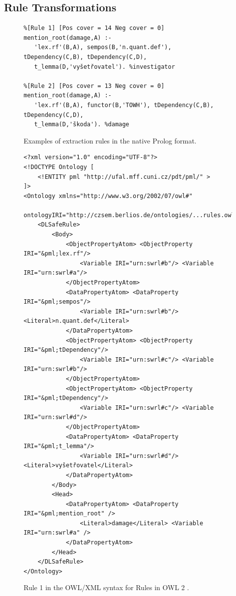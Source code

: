 \clearpage

\subsection{Rule Transformations}



\begin{figure}[h!]
\begin{verbatim}
%[Rule 1] [Pos cover = 14 Neg cover = 0]
mention_root(damage,A) :-
   'lex.rf'(B,A), sempos(B,'n.quant.def'), tDependency(C,B), tDependency(C,D), 
   t_lemma(D,'vyšetřovatel'). %investigator

%[Rule 2] [Pos cover = 13 Neg cover = 0]
mention_root(damage,A) :-
   'lex.rf'(B,A), functor(B,'TOWH'), tDependency(C,B), tDependency(C,D), 
   t_lemma(D,'škoda'). %damage
\end{verbatim}
	\caption{Examples of extraction rules in the native Prolog format.}
	\label{fig:rules_prolog}
\end{figure}



\begin{figure}[h!]
\begin{verbatim}
<?xml version="1.0" encoding="UTF-8"?>
<!DOCTYPE Ontology [
	<!ENTITY pml "http://ufal.mff.cuni.cz/pdt/pml/" >
]>
<Ontology xmlns="http://www.w3.org/2002/07/owl#"
	ontologyIRI="http://czsem.berlios.de/ontologies/...rules.owl">
	<DLSafeRule>
		<Body>
			<ObjectPropertyAtom> <ObjectProperty IRI="&pml;lex.rf"/>
				<Variable IRI="urn:swrl#b"/> <Variable IRI="urn:swrl#a"/>
			</ObjectPropertyAtom>
			<DataPropertyAtom> <DataProperty IRI="&pml;sempos"/>
				<Variable IRI="urn:swrl#b"/> <Literal>n.quant.def</Literal>
			</DataPropertyAtom>
			<ObjectPropertyAtom> <ObjectProperty IRI="&pml;tDependency"/>
				<Variable IRI="urn:swrl#c"/> <Variable IRI="urn:swrl#b"/>
			</ObjectPropertyAtom>
			<ObjectPropertyAtom> <ObjectProperty IRI="&pml;tDependency"/>
				<Variable IRI="urn:swrl#c"/> <Variable IRI="urn:swrl#d"/>
			</ObjectPropertyAtom>
			<DataPropertyAtom> <DataProperty IRI="&pml;t_lemma"/>
				<Variable IRI="urn:swrl#d"/> <Literal>vyšetřovatel</Literal>
			</DataPropertyAtom>
		</Body>
		<Head>
			<DataPropertyAtom> <DataProperty IRI="&pml;mention_root" />
				<Literal>damage</Literal> <Variable IRI="urn:swrl#a" />
			</DataPropertyAtom>
		</Head>
	</DLSafeRule>
</Ontology>
\end{verbatim}
\caption{Rule 1 in the OWL/XML syntax for Rules in OWL 2 \citep{GHPP09a}.}
\label{fig:rules_xml}
\end{figure}






